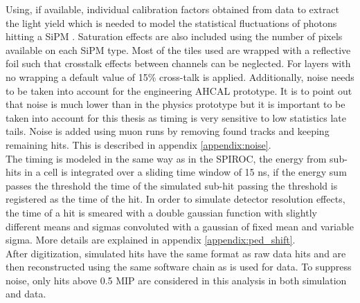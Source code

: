 Using, if available, individual calibration factors obtained from data to extract the light yield which is needed to model the statistical fluctuations of photons hitting a SiPM \cite{Hartbrich:2016bbz}. Saturation effects are also included using the number of pixels available on each SiPM type. Most of the tiles used are wrapped with a reflective foil such that crosstalk effects between channels can be neglected. For layers with no wrapping a default value of 15\% cross-talk is applied. Additionally, noise needs to be taken into account for the engineering AHCAL prototype. It is to point out that noise is much lower than in the physics prototype but it is important to be taken into account for this thesis as timing is very sensitive to low statistics late tails. Noise is added using muon runs by removing found tracks and keeping remaining hits. This is described in appendix \ref{appendix:noise}.\\

The timing is modeled in the same way as in the SPIROC, the energy from sub-hits in a cell is integrated over a sliding time window of 15 ns, if the energy sum passes the threshold the time of the simulated sub-hit passing the threshold is registered as the time of the hit. In order to simulate detector resolution effects, the time of a hit is smeared with a double gaussian function with slightly different means and sigmas convoluted with a gaussian of fixed mean and variable sigma. More details are explained in appendix \ref{appendix:ped_shift}.\\

After digitization, simulated hits have the same format as raw data hits and are then reconstructed using the same software chain as is used for data. To suppress noise, only hits above 0.5 MIP are considered in this analysis in both simulation and data.
